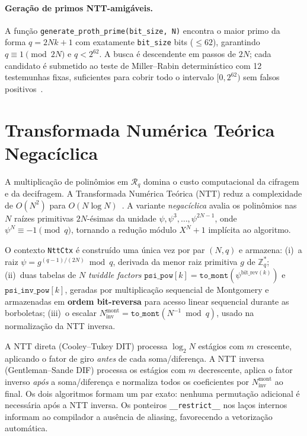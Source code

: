 \documentclass[11pt,a4paper]{article}
\newcommand{\Rq}{\mathcal{R}_q}
\begin{document}
\paragraph{Geração de primos NTT-amigáveis.}
A função \texttt{generate\_proth\_prime(bit\_size, N)} encontra o maior primo da forma
$q = 2Nk+1$ com exatamente \texttt{bit\_size} bits ($\leq 62$), garantindo
$q \equiv 1 \pmod{2N}$ e $q < 2^{62}$. A busca é descendente em passos de $2N$; cada
candidato é submetido ao teste de Miller--Rabin determinístico com 12 testemunhas fixas,
suficientes para cobrir todo o intervalo $[0, 2^{62})$ sem falsos
positivos~\cite{Pomerance1980}.

\section{Transformada Numérica Teórica Negacíclica}
\label{sec:ntt}

A multiplicação de polinômios em $\Rq$ domina o custo computacional da cifragem e da
decifragem. A Transformada Numérica Teórica (NTT) reduz a complexidade de $O(N^2)$
para $O(N\log N)$~\cite{LongaNaehrig2016}. A variante \emph{negacíclica} avalia os
polinômios nas $N$ raízes primitivas $2N$-ésimas da unidade
$\psi, \psi^3, \ldots, \psi^{2N-1}$, onde $\psi^N \equiv -1 \pmod{q}$, tornando a
redução módulo $X^N+1$ implícita ao algoritmo.

O contexto \texttt{NttCtx} é construído uma única vez por par $(N, q)$ e armazena:
(i)~a raiz $\psi = g^{(q-1)/(2N)} \bmod q$, derivada da menor raiz primitiva $g$ de
$\mathbb{Z}_q^*$; (ii)~duas tabelas de $N$ \emph{twiddle factors}
$\texttt{psi\_pow}[k] = \texttt{to\_mont}(\psi^{\text{bit\_rev}(k)})$ e
$\texttt{psi\_inv\_pow}[k]$, geradas por multiplicação sequencial de Montgomery e
armazenadas em \textbf{ordem bit-reversa} para acesso linear sequencial durante as
borboletas; (iii)~o escalar $N_{\text{inv}}^{\text{mont}} = \texttt{to\_mont}(N^{-1}
\bmod q)$, usado na normalização da NTT inversa.

A NTT direta (Cooley--Tukey DIT) processa $\log_2 N$ estágios com $m$ crescente,
aplicando o fator de giro \emph{antes} de cada soma/diferença. A NTT inversa
(Gentleman--Sande DIF) processa os estágios com $m$ decrescente, aplica o fator
inverso \emph{após} a soma/diferença e normaliza todos os coeficientes por
$N_{\text{inv}}^{\text{mont}}$ ao final. Os dois algoritmos formam um par exato:
nenhuma permutação adicional é necessária após a NTT inversa. Os ponteiros
\texttt{\_\_restrict\_\_} nos laços internos informam ao compilador a ausência de
aliasing, favorecendo a vetorização automática.
\end{document}
